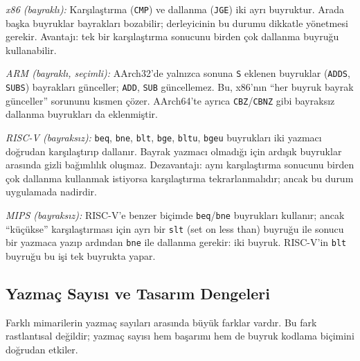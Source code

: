 \begin{karsilastirma}
\emph{x86 (bayraklı):} Karşılaştırma (\texttt{CMP}) ve dallanma (\texttt{JGE}) iki ayrı buyruktur. Arada başka buyruklar bayrakları bozabilir; derleyicinin bu durumu dikkatle yönetmesi gerekir. Avantajı: tek bir karşılaştırma sonucunu birden çok dallanma buyruğu kullanabilir.

\emph{ARM (bayraklı, seçimli):} AArch32'de yalnızca sonuna \texttt{S} eklenen buyruklar (\texttt{ADDS}, \texttt{SUBS}) bayrakları günceller; \texttt{ADD}, \texttt{SUB} güncellemez. Bu, x86'nın ``her buyruk bayrak günceller'' sorununu kısmen çözer. AArch64'te ayrıca \texttt{CBZ}/\texttt{CBNZ} gibi bayraksız dallanma buyrukları da eklenmiştir.

\emph{RISC-V (bayraksız):} \texttt{beq}, \texttt{bne}, \texttt{blt}, \texttt{bge}, \texttt{bltu}, \texttt{bgeu} buyrukları iki yazmacı doğrudan karşılaştırıp dallanır. Bayrak yazmacı olmadığı için ardışık buyruklar arasında gizli bağımlılık oluşmaz. Dezavantajı: aynı karşılaştırma sonucunu birden çok dallanma kullanmak istiyorsa karşılaştırma tekrarlanmalıdır; ancak bu durum uygulamada nadirdir.

\emph{MIPS (bayraksız):} RISC-V'e benzer biçimde \texttt{beq}/\texttt{bne} buyrukları kullanır; ancak ``küçükse'' karşılaştırması için ayrı bir \texttt{slt} (set on less than) buyruğu ile sonucu bir yazmaca yazıp ardından \texttt{bne} ile dallanma gerekir: iki buyruk. RISC-V'in \texttt{blt} buyruğu bu işi tek buyrukta yapar.
\end{karsilastirma}

\subsection{Yazmaç Sayısı ve Tasarım Dengeleri}
\label{subsec:yazmac-sayisi-dengesi}

Farklı mimarilerin yazmaç sayıları arasında büyük farklar vardır. Bu fark rastlantısal değildir; yazmaç sayısı hem başarımı hem de buyruk kodlama biçimini doğrudan etkiler.

